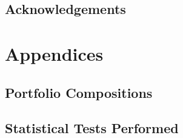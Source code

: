 \documentclass[12pt,a4paper]{article}
\begin{document}
\newpage



\begin{center}
\section*{Acknowledgements} %
\label{sec:Acknow}
\end{center}

\newpage


\appendix
\section*{Appendices}
\label{sec:Appendices}
\renewcommand{\thesubsection}{\Alph{subsection}}

\subsection{Portfolio Compositions}
\label{subsec: PortComp}

\subsection{Statistical Tests Performed}
\label{subsec: StatsTests}

\newpage
\end{document}
